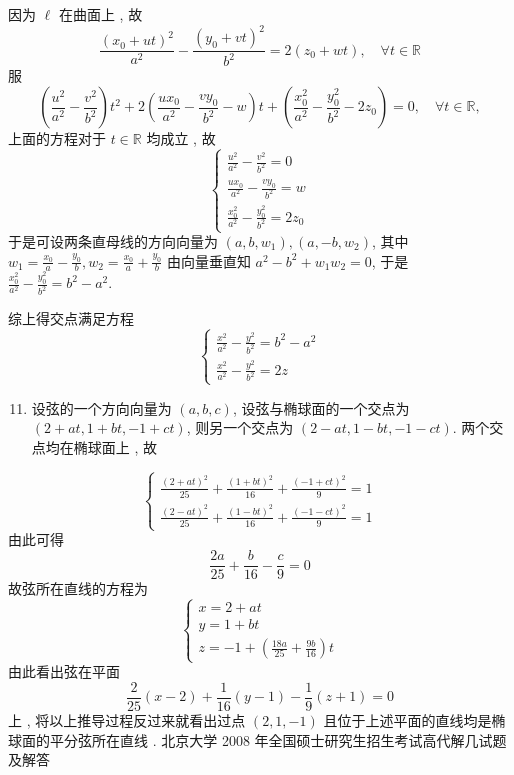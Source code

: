 \documentclass[10pt]{article}
\begin{document}
 因为  $\ell$  在曲面上 ,  故 
$$
\frac{\left(x_{0}+u t\right)^{2}}{a^{2}}-\frac{\left(y_{0}+v t\right)^{2}}{b^{2}}=2\left(z_{0}+w t\right), \quad \forall t \in \mathbb{R}
$$
 服 
$$
\left(\frac{u^{2}}{a^{2}}-\frac{v^{2}}{b^{2}}\right) t^{2}+2\left(\frac{u x_{0}}{a^{2}}-\frac{v y_{0}}{b^{2}}-w\right) t+\left(\frac{x_{0}^{2}}{a^{2}}-\frac{y_{0}^{2}}{b^{2}}-2 z_{0}\right)=0, \quad \forall t \in \mathbb{R},
$$
 上面的方程对于  $t \in \mathbb{R}$  均成立 ,  故 
$$
\left\{\begin{array}{c}
\frac{u^{2}}{a^{2}}-\frac{v^{2}}{b^{2}}=0 \\
\frac{u x_{0}}{a^{2}}-\frac{v y_{0}}{b^{2}}=w \\
\frac{x_{0}^{2}}{a^{2}}-\frac{y_{0}^{2}}{b^{2}}=2 z_{0}
\end{array}\right.
$$
 于是可设两条直母线的方向向量为  $\left(a, b, w_{1}\right),\left(a,-b, w_{2}\right)$,  其中  $w_{1}=\frac{x_{0}}{a}-\frac{y_{0}}{b}, w_{2}=\frac{x_{0}}{a}+\frac{y_{0}}{b}$  由向量垂直知  $a^{2}-b^{2}+w_{1} w_{2}=0$,  于是  $\frac{x_{0}^{2}}{a^{2}}-\frac{y_{0}^{2}}{b^{2}}=b^{2}-a^{2}$.

 综上得交点满足方程 
$$
\left\{\begin{array}{l}
\frac{x^{2}}{a^{2}}-\frac{y^{2}}{b^{2}}=b^{2}-a^{2} \\
\frac{x^{2}}{a^{2}}-\frac{y^{2}}{b^{2}}=2 z
\end{array}\right.
$$

\begin{enumerate}
  \setcounter{enumi}{10}
  \item  设弦的一个方向向量为  $(a, b, c)$,  设弦与椭球面的一个交点为  $(2+a t, 1+b t,-1+c t)$,  则另一个交点为  $(2-a t, 1-b t,-1-c t)$.  两个交点均在椭球面上 ,  故 
\end{enumerate}
$$
\left\{\begin{array}{l}
\frac{(2+a t)^{2}}{25}+\frac{(1+b t)^{2}}{16}+\frac{(-1+c t)^{2}}{9}=1 \\
\frac{(2-a t)^{2}}{25}+\frac{(1-b t)^{2}}{16}+\frac{(-1-c t)^{2}}{9}=1
\end{array}\right.
$$
 由此可得 
$$
\frac{2 a}{25}+\frac{b}{16}-\frac{c}{9}=0
$$
 故弦所在直线的方程为 
$$
\left\{\begin{array}{l}
x=2+a t \\
y=1+b t \\
z=-1+\left(\frac{18 a}{25}+\frac{9 b}{16}\right) t
\end{array}\right.
$$
 由此看出弦在平面 
$$
\frac{2}{25}(x-2)+\frac{1}{16}(y-1)-\frac{1}{9}(z+1)=0
$$
 上 ,  将以上推导过程反过来就看出过点  $(2,1,-1)$  且位于上述平面的直线均是椭球面的平分弦所在直线 .  北京大学  2008  年全国硕士研究生招生考试高代解几试题及解答 
\end{document}
